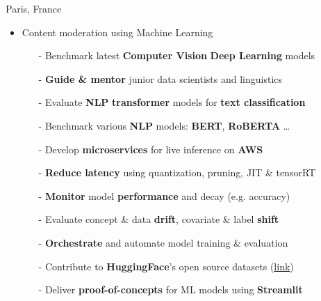 \documentclass[10pt,a4paper,ragged2e]{altacv}
\begin{document}
     {Paris, France}
\begin{itemize}
	\item  Content moderation using Machine Learning
	\vspace{0.5em}
	\begin{itemize}
		\item[-] Benchmark latest \textbf{Computer Vision} \textbf{Deep Learning} models
		\item[-] \textbf{Guide \& mentor} junior data scientists and linguistics
		\item[-] Evaluate \textbf{NLP} \textbf{transformer} models for \textbf{text classification} 
		\item[-] Benchmark various \textbf{NLP} models: \textbf{BERT}, \textbf{RoBERTA} \dots
		\item[-] Develop \textbf{microservices} for live inference on \textbf{AWS}
		\item[-] \textbf{Reduce latency} using quantization, pruning, JIT \& tensorRT
		\item[-] \textbf{Monitor} model \textbf{performance} and decay (e.g. accuracy)
		\item[-] Evaluate concept \& data \textbf{drift}, covariate \& label \textbf{shift}
		\item[-] \textbf{Orchestrate} and automate model training \& evaluation 
		\item[-] Contribute to \textbf{HuggingFace}'s open source datasets (\href{https://github.com/pulls?q=is%3Apr+author%3Ahfawaz+archived%3Afalse+is%3Aclosed+huggingface+is%3Amerged}{link})
		\item[-] Deliver \textbf{proof-of-concepts} for ML models using \textbf{Streamlit}
	\end{itemize}
\end{itemize}

\divider
\end{document}
